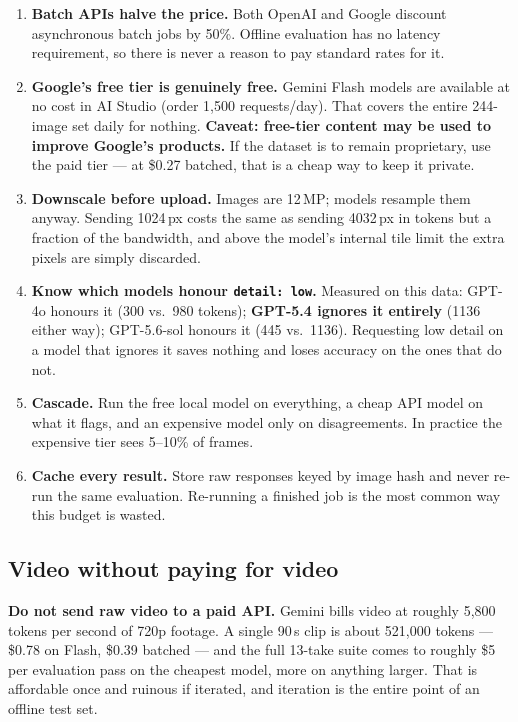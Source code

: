 \documentclass[11pt,a4paper]{article}
\newcommand{\gap}[1]{\textcolor{warn}{\textbf{#1}}}
\begin{document}
\begin{enumerate}[leftmargin=*,itemsep=2pt]
\item \textbf{Batch APIs halve the price.} Both OpenAI and Google discount
asynchronous batch jobs by 50\%. Offline evaluation has no latency requirement,
so there is never a reason to pay standard rates for it.

\item \textbf{Google's free tier is genuinely free.} Gemini Flash models are
available at no cost in AI Studio (order 1{,}500 requests/day). That covers the
entire 244-image set daily for nothing. \gap{Caveat: free-tier content may be
used to improve Google's products.} If the dataset is to remain proprietary, use
the paid tier --- at \$0.27 batched, that is a cheap way to keep it private.

\item \textbf{Downscale before upload.} Images are 12\,MP; models resample them
anyway. Sending 1024\,px costs the same as sending 4032\,px in tokens but a
fraction of the bandwidth, and above the model's internal tile limit the extra
pixels are simply discarded.

\item \textbf{Know which models honour \texttt{detail: low}.} Measured on this
data: GPT-4o honours it (300 vs.\ 980 tokens); \textbf{GPT-5.4 ignores it
entirely} (1136 either way); GPT-5.6-sol honours it (445 vs.\ 1136). Requesting
low detail on a model that ignores it saves nothing and loses accuracy on the
ones that do not.

\item \textbf{Cascade.} Run the free local model on everything, a cheap API
model on what it flags, and an expensive model only on disagreements. In
practice the expensive tier sees 5--10\% of frames.

\item \textbf{Cache every result.} Store raw responses keyed by image hash and
never re-run the same evaluation. Re-running a finished job is the most common
way this budget is wasted.
\end{enumerate}

\subsection{Video without paying for video}
\label{sec:videocost}

\gap{Do not send raw video to a paid API.} Gemini bills video at roughly
5{,}800 tokens per second of 720p footage. A single 90\,s clip is about 521{,}000
tokens --- \$0.78 on Flash, \$0.39 batched --- and the full 13-take suite comes to
roughly \$5 per evaluation pass on the cheapest model, more on anything larger.
That is affordable once and ruinous if iterated, and iteration is the entire
point of an offline test set.
\end{document}
